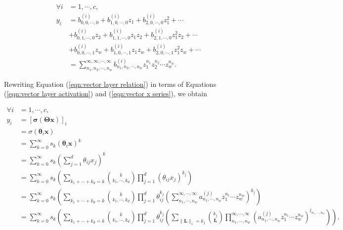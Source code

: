 \begin{align}
    \forall i &= 1, \cdots, c, \nonumber \\ y_i
    &= b^{(i)}_{0,0,\cdots,0} + b^{(i)}_{1,0,\cdots,0} z_1 + b^{(i)}_{2,0,\cdots,0} z_1^2 + \cdots \nonumber \\
    &+ b^{(i)}_{0,1,\cdots,0} z_2 + b^{(i)}_{1,1,\cdots,0} z_1 z_2 + b^{(i)}_{2,1,\cdots,0} z_1^2 z_2 + \cdots \nonumber \\
    &+ b^{(i)}_{0,0,\cdots,1} z_w + b^{(i)}_{1,0,\cdots,1} z_1 z_w + b^{(i)}_{2,0,\cdots,1} z_1^2 z_w + \cdots \nonumber \\
    &= \sum_{n_1,n_2,\cdots,n_w}^{\infty,\infty,\cdots,\infty} b^{(i)}_{n_1,n_2,\cdots,n_w} z_1^{n_1} z_2^{n_2} \cdots z_w^{n_w}.
    \label{eqn:vector y series}
\end{align}

Rewriting Equation (\ref{eqn:vector layer relation}) in terms of Equations (\ref{eqn:vector layer activation}) and (\ref{eqn:vector x series}), we obtain

\begin{align}
    \forall i &= 1, \cdots, c, \nonumber \\ y_i
    &= \left[\mathbf{\sigma}(\mathbf{\Theta} \mathbf{x})\right]_i \nonumber \\
    &= \sigma(\mathbf{\theta}_i \mathbf{x}) \nonumber \\
    &= \sum_{k=0}^{\infty} s_k (\mathbf{\theta}_i \mathbf{x})^k \nonumber \\
    &= \sum_{k=0}^{\infty} s_k \left(\sum_{j=1}^{d} \theta_{ij} x_{j}\right)^k \nonumber \\
    &= \sum_{k=0}^{\infty} s_k \left(\sum_{k_1 + \cdots + k_d = k} \binom{k}{k_1, \cdots, k_d} \prod_{j=1}^{d} (\theta_{ij} x_j)^{k_j} \right) \nonumber \\
    &= \sum_{k=0}^{\infty} s_k \left(\sum_{k_1 + \cdots + k_d = k} \binom{k}{k_1, \cdots, k_d} \prod_{j=1}^{d}\theta_{ij}^{k_j} \left(\sum_{n_1, \cdots, n_w}^{\infty,
    \cdots, \infty} a^{(j)}_{n_1,\cdots,n_w} z_1^{n_1}  \cdots z_w^{n_w} \right)^{k_j}\right) \nonumber \\
    &= \sum_{k=0}^{\infty} s_k \left(\sum_{k_1 + \cdots + k_d = k} \binom{k}{k_1, \cdots, k_d} \prod_{j=1}^{d} \theta_{ij}^{k_j} \left(\sum_{\lVert \mathbf{L} \rVert_1 = k_j} \binom{k_j}{\mathbf{L}} \prod_{n_1, \cdots, n_w}^{\infty, \cdots, \infty} (a^{(j)}_{n_1, \cdots, n_w} z_1^{n_1} \cdots z_w^{n_w})^{l_{n_1, \cdots, n_w}} \right)\right). \nonumber \\
    \label{eqn:vector y expansion}
\end{align}

